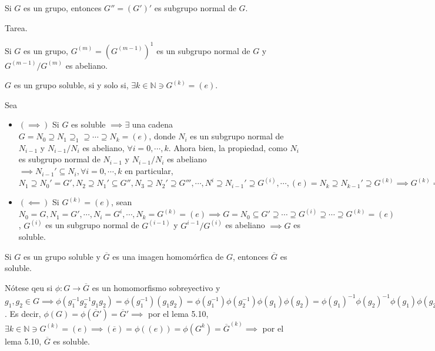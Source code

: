 \begin{prop}
    Si $G$ es un grupo, entonces $G''=(G')'$ es subgrupo normal de $G$. 
    \begin{dem}
        Tarea.
    \end{dem}
\end{prop}

\begin{prop}
    Si $G$ es un grupo, $G^{(m)}=(G^{(m-1)})^1$ es un subgrupo normal de $G$ y $G^{(m-1)}/G^{(m)}$ es abeliano. 
\end{prop}

\begin{lema}[5.10]
    $G$ es un grupo soluble, si y solo si, $\exists k\in \mathbb{N}\ni G^{(k)}=(e)$.
    \begin{dem}
        Sea 
        \begin{itemize}
            \item $(\implies)$ Si $G$ es soluble $\implies\exists$ una cadena $G=N_0\supseteq N_1\supseteq_1 \supseteq\cdots \supseteq N_k=(e)$, donde $N_i$ es un subgrupo normal de $N_{i-1}$ y $N_{i-1}/N_i$ es abeliano, $\forall i=0,\cdots, k$. Ahora bien, la propiedad, como $N_i$ es subgrupo normal de $N_{i-1}$ y $N_{i-1}/N_i$ es abeliano $\implies N_{i-1}'\subseteq N_i,\forall i=0,\cdots,k$ en particular, $N_1\supseteq N_0'=G', N_2\supseteq N_1'\subseteq G'',N_3\supseteq N_2'\supseteq G''',\cdots, N^i\supseteq N_{i-1}'\supseteq G^{(i)},\cdots, (e)=N_k\supseteq N_{k-1}'\supseteq G^{(k)}\implies G^{(k)}=(e)$
            \item $(\impliedby)$ Si $G^{(k)}=(e)$, sean $N_0=G,N_1=G',\cdots, N_i=G^{i}, \cdots, N_k=G^{(k)}=(e)\implies G=N_0\subseteq G'\supseteq \cdots \supseteq G^{(i)}\supseteq \cdots \supseteq G^{(k)}=(e)$, $G^{(i)}$ es un subgrupo normal de $G^{(i-1)}$ y $G^{i-1}/G^{(i)}$ es abeliano $\implies G$ es soluble. 
         \end{itemize}
    \end{dem}
\end{lema}

\begin{corolario}
    Si $G$ es un grupo soluble y $\overline{G}$ es una imagen homomórfica de $G$, entonces $\overline{G}$ es soluble. 
    \begin{dem}
        Nótese qeu si $\phi:G\to \overline{G}$ es un homomorfismo sobreyectivo y $g_1,g_2\in G\implies\phi(g_1^{-1}g_2^{-1}g_1g_2)=\phi(g_1^{-1})(g_1g_2)=\phi(g_1^{-1})\phi(g_2^{-1})\phi(g_1)\phi(g_2)=\phi(g_1)^{-1}\phi(g_2)^{-1}\phi(g_1)\phi(g_2)$. Es decir, $\phi(G)=\phi(\overline{G}')=\overline{G}'\implies$ por el lema 5.10, $\exists k\in \mathbb{N}\ni G^{(k)}=(e)\implies (\overline{e})=\phi((e))=\phi(G^{k})=\overline{G}^{(k)}\implies$ por el lema 5.10, $\overline{G}$ es soluble. 
    \end{dem}
\end{corolario}